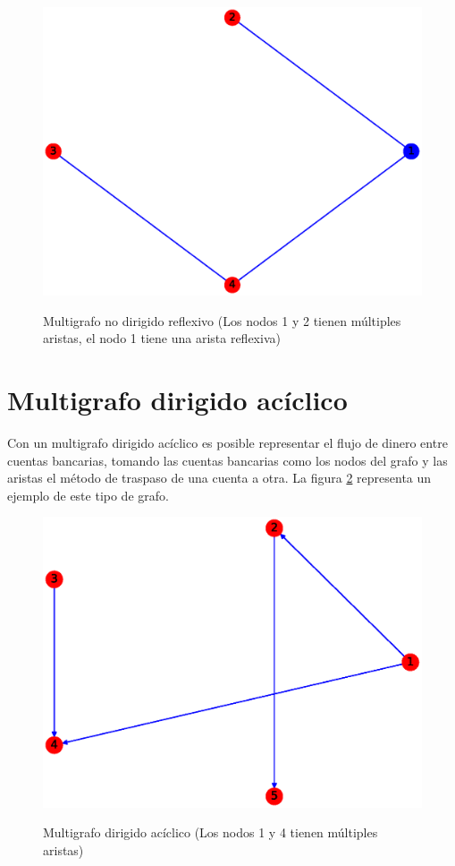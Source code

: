 \documentclass{article}
\begin{document}
\begin{figure}[h!]
    \caption{Multigrafo no dirigido reflexivo (Los nodos 1 y 2 tienen múltiples aristas, el nodo 1 tiene una arista reflexiva)}
    \includegraphics[width=\textwidth]{9-MNDR}
    \label{fig:MNDR}
\end{figure}



\section{Multigrafo dirigido acíclico}
Con un multigrafo dirigido acíclico es posible representar el flujo de dinero entre cuentas bancarias, tomando las cuentas bancarias como los nodos del grafo y las aristas el método de traspaso de una cuenta a otra. La figura \ref{fig:MDA} representa un ejemplo de este tipo de grafo.
\begin{figure}[h!]
    \caption{Multigrafo dirigido acíclico (Los nodos 1 y 4 tienen múltiples aristas)}
    \includegraphics[width=\textwidth]{10-MDA}
    \label{fig:MDA}
\end{figure}
\end{document}
